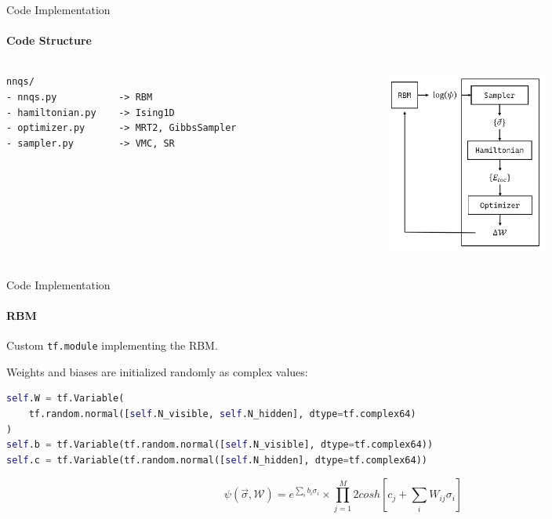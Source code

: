 \documentclass{beamer}
\begin{document}
\begin{frame}[fragile]{Code Implementation}
\framesubtitle{Code Structure}
\begin{columns}
\begin{column}{0.5\textwidth}
\begin{lstlisting}[style=kaolstplain]
nnqs/
- nnqs.py			-> RBM
- hamiltonian.py	-> Ising1D
- optimizer.py		-> MRT2, GibbsSampler
- sampler.py		-> VMC, SR
\end{lstlisting}
\end{column}
\begin{column}{0.5\textwidth}
\begin{center}
\includegraphics[height=6cm]{images/pipeline.png}
\end{center}
\end{column}
\end{columns}
\end{frame}

\begin{frame}[fragile]{Code Implementation}
\framesubtitle{RBM}

Custom \lstinline[style=kaolstplain]|tf.module| implementing the RBM.
\baselineskip

Weights and biases are initialized randomly as complex values:
\begin{lstlisting}[language=Python, style=kaolstplain]
self.W = tf.Variable(
	tf.random.normal([self.N_visible, self.N_hidden], dtype=tf.complex64)
)
self.b = tf.Variable(tf.random.normal([self.N_visible], dtype=tf.complex64))
self.c = tf.Variable(tf.random.normal([self.N_hidden], dtype=tf.complex64))
\end{lstlisting}

$$\psi\left(\vec{\sigma}, \mathcal{W}\right) = e^{\sum_{i} b_i \sigma_i} \times \prod_{j=1}^{M} {2 cosh\left[c_j + \sum_{i} W_{ij} \sigma_i\right]}$$

\end{frame}
\end{document}
